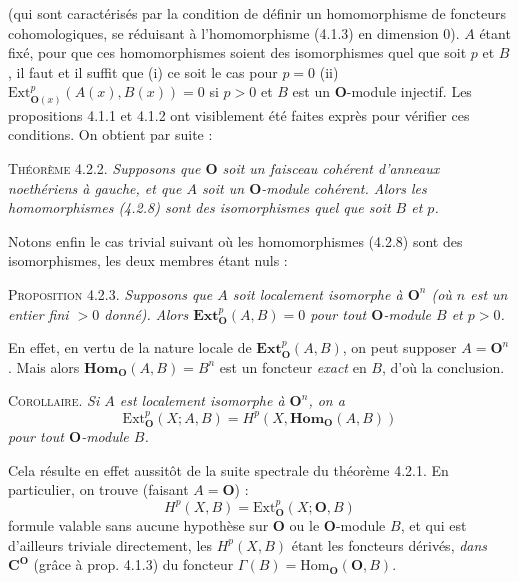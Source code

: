 \clearpage
{}

\noindent (qui sont caractérisés par la condition de définir un homomorphisme
de foncteurs cohomologiques, se réduisant à l'homomorphisme (4.1.3) en
dimension 0).
$A$ étant fixé, pour que ces homomorphismes soient des isomorphismes quel que
soit $p$ et $B$, il faut et il suffit que (i) ce soit le cas pour $p=0$
(ii) $\mathrm{Ext}_{{\mathbf O}(x)}^p(A(x),B(x))=0$ si $p>0$ et $B$ est un ${\mathbf O}$-module
injectif. Les propositions 4.1.1 et 4.1.2 ont visiblement été faites exprès
pour vérifier ces conditions. On obtient par suite :

\textsc{Théorème 4.2.2.} \textit{Supposons que ${\mathbf O}$ soit un faisceau
cohérent d'anneaux noethériens à gauche, et que $A$ soit un ${\mathbf O}$-module
cohérent. Alors les homomorphismes \textup{(4.2.8)} sont des isomorphismes quel que soit
$B$ et $p$.}

Notons enfin le cas trivial suivant où les homomorphismes (4.2.8) sont des
isomorphismes, les deux membres étant nuls :

\textsc{Proposition 4.2.3.} \textit{Supposons que $A$ soit localement
isomorphe à ${\mathbf O}^n$ \textup{(}où $n$ est un entier fini $>0$ donné\textup{)}. Alors
$\mathbf{Ext}_{\mathbf O}^p(A,B)=0$ pour tout ${\mathbf O}$-module $B$ et $p>0$.}

En effet, en vertu de la nature locale de $\mathbf{Ext}_{\mathbf O}^p(A,B)$, on peut
supposer $A={\mathbf O}^n$. Mais alors $\mathbf{Hom}_{\mathbf O}(A,B)=B^n$ est un foncteur
\textit{exact} en $B$, d'où la conclusion.

\textsc{Corollaire.} \textit{Si $A$ est localement isomorphe à
${\mathbf O}^n$, on a}
\[
\mathrm{Ext}_{\mathbf O}^p(X;A,B)=H^p(X,\mathbf{Hom}_{\mathbf O}(A,B))
\]
\textit{pour tout ${\mathbf O}$-module $B$.}

Cela résulte en effet aussitôt de la suite spectrale du théorème 4.2.1. En
particulier, on trouve (faisant $A={\mathbf O}$) :
\[
\tag{4.2.9}
H^p(X,B)=\mathrm{Ext}_{\mathbf O}^p(X;{\mathbf O},B)
\]
formule valable sans aucune hypothèse sur ${\mathbf O}$ ou le ${\mathbf O}$-module $B$, et qui est
d'ailleurs triviale directement, les $H^p(X,B)$ étant les foncteurs dérivés,
\textit{dans $\mathbf C^{\mathbf O}$} (grâce à prop. 4.1.3) du foncteur
$\Gamma(B)=\mathrm{Hom}_{\mathbf O}({\mathbf O},B)$.

